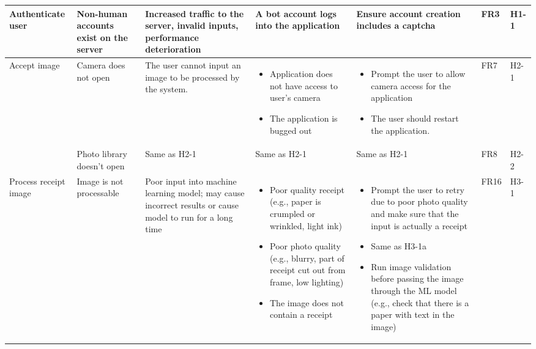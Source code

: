 \documentclass{article}
\begin{document}
\begin{landscape}
\begin{longtable}{|p{3cm}|p{4cm}|p{5cm}|p{5cm}|p{5cm}|p{1cm}|p{0.75cm}|}
    Authenticate user & 
    Non-human accounts exist on the server & 
    Increased traffic to the server, invalid inputs, performance deterioration & 
    A bot account logs into the application & 
    Ensure account creation includes a captcha & 
    FR3 & 
    H1-1 \\
    \hline
    Accept image & 
    Camera does not open &
    The user cannot input an image to be processed by the system. &
    \begin{itemize}[leftmargin=0.5cm]
        \item Application does not have access to user's camera
        \item The application is bugged out
    \end{itemize} &
    \begin{itemize}[leftmargin=0.5cm]
        \item Prompt the user to allow camera access for the application
        \item The user should restart the application. 
    \end{itemize} &
    FR7 &
    H2-1\\
    \cline{2-7}
     & 
    Photo library doesn't open &
    Same as H2-1 &
    Same as H2-1 &
    Same as H2-1 &
    FR8 &
    H2-2\\
    \hline
    Process receipt image &
    Image is not processable &
    Poor input into machine learning model; may cause incorrect results or cause model to run for a long time &
    \begin{itemize}[leftmargin=0.5cm]
        \item Poor quality receipt (e.g., paper is crumpled or wrinkled, light ink) 
        \item Poor photo quality (e.g., blurry, part of receipt cut out from frame, low lighting)
        \item The image does not contain a receipt
    \end{itemize} &
    \begin{itemize}[leftmargin=0.5cm]
        \item Prompt the user to retry due to poor photo quality and make sure that the input is actually a receipt
        \item Same as H3-1a
        \item Run image validation before passing the image through the ML model (e.g., check that there is a paper with text in the image)
    \end{itemize} &
    FR16 &
    H3-1\\ 

\end{longtable}
\end{landscape}
\end{document}
